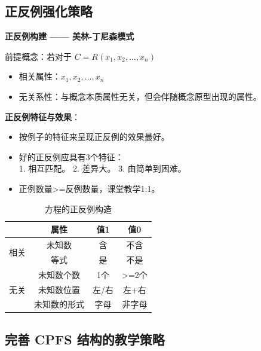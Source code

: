 \subsection{正反例强化策略}
\begin{multicols}{2}
    

\textbf{正反例构建 —— 美林-丁尼森模式}

前提概念：若对于 $C = R(x_1, x_2, \ldots, x_n)$

\begin{itemize}
    \item 相关属性：$x_1, x_2, \ldots, x_n$
    \item 无关系性：与概念本质属性无关，但会伴随概念原型出现的属性。
\end{itemize}

\columnbreak

\textbf{正反例特征与效果}：
\begin{itemize}
    \item 按例子的特征来呈现正反例的效果最好。
    \item 好的正反例应具有3个特征：\\
    1. 相互匹配。
    2. 差异大。
    3. 由简单到困难。
    \item 正例数量>=反例数量，课堂教学1:1。
\end{itemize}
\end{multicols}

\begin{table}[h!]
\centering
\begin{tabular}{c|c|c|c}
  & 属性 & 值1 & 值0 \\ 
\hline
\multirow{2}{*}{相关} 
& 未知数 & 含 & 不含 \\ \cline{2-4}
& 等式 & 是 & 不是 \\ 
\hline
\multirow{3}{*}{无关} 
& 未知数个数 & 1个 & >=2个 \\ \cline{2-4}
& 未知数位置 & 左/右 & 左+右 \\ \cline{2-4}
& 未知数的形式 & 字母 & 非字母 \\ 
\hline
\end{tabular}
\caption{方程的正反例构造}
\end{table}

\subsection{完善 CPFS 结构的教学策略}

